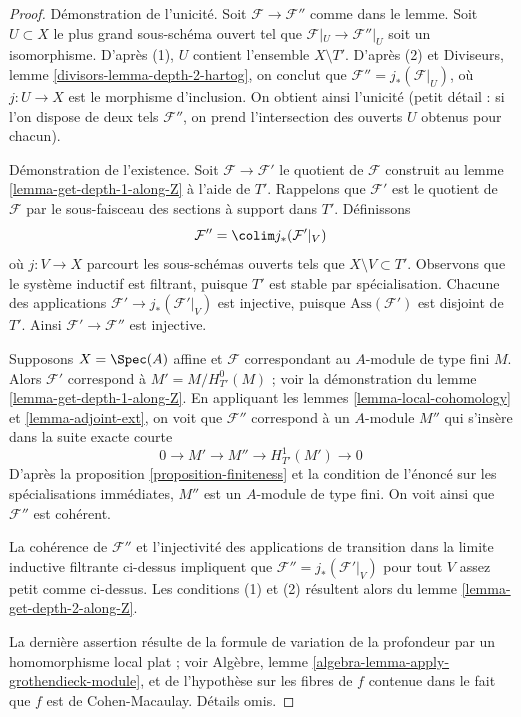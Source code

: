 \begin{proof}
Démonstration de l'unicité. Soit $\mathcal{F} \to \mathcal{F}''$ comme dans le lemme. Soit $U \subset X$ le plus grand sous-schéma ouvert tel que $\mathcal{F}|_U \to \mathcal{F}''|_U$ soit un isomorphisme. D'après (1), $U$ contient l'ensemble $X \setminus T'$. D'après (2) et Diviseurs, lemme \ref{divisors-lemma-depth-2-hartog}, on conclut que $\mathcal{F}'' = j_*(\mathcal{F}|_U)$, où $j : U \to X$ est le morphisme d'inclusion. On obtient ainsi l'unicité (petit détail : si l'on dispose de deux tels $\mathcal{F}''$, on prend l'intersection des ouverts $U$ obtenus pour chacun).

\medskip\noindent
Démonstration de l'existence. Soit $\mathcal{F} \to \mathcal{F}'$ le quotient de $\mathcal{F}$ construit au lemme \ref{lemma-get-depth-1-along-Z} à l'aide de $T'$. Rappelons que $\mathcal{F}'$ est le quotient de $\mathcal{F}$ par le sous-faisceau des sections à support dans $T'$. Définissons
$$
\mathcal{F}'' = \colim j_*(\mathcal{F}'|_V)
$$
où $j : V \to X$ parcourt les sous-schémas ouverts tels que $X \setminus V \subset T'$. Observons que le système inductif est filtrant, puisque $T'$ est stable par spécialisation. Chacune des applications $\mathcal{F}' \to j_*(\mathcal{F}'|_V)$ est injective, puisque $\text{Ass}(\mathcal{F}')$ est disjoint de $T'$. Ainsi $\mathcal{F}' \to \mathcal{F}''$ est injective.

\medskip\noindent
Supposons $X = \Spec(A)$ affine et $\mathcal{F}$ correspondant au $A$-module de type fini $M$. Alors $\mathcal{F}'$ correspond à $M' = M / H^0_{T'}(M)$ ; voir la démonstration du lemme \ref{lemma-get-depth-1-along-Z}. En appliquant les lemmes \ref{lemma-local-cohomology} et \ref{lemma-adjoint-ext}, on voit que $\mathcal{F}''$ correspond à un $A$-module $M''$ qui s'insère dans la suite exacte courte
$$
0 \to M' \to M'' \to H^1_{T'}(M') \to 0
$$
D'après la proposition \ref{proposition-finiteness} et la condition de l'énoncé sur les spécialisations immédiates, $M''$ est un $A$-module de type fini. On voit ainsi que $\mathcal{F}''$ est cohérent.

\medskip\noindent
La cohérence de $\mathcal{F}''$ et l'injectivité des applications de transition dans la limite inductive filtrante ci-dessus impliquent que $\mathcal{F}'' = j_*(\mathcal{F}'|_V)$ pour tout $V$ assez petit comme ci-dessus. Les conditions (1) et (2) résultent alors du lemme \ref{lemma-get-depth-2-along-Z}.

\medskip\noindent
La dernière assertion résulte de la formule de variation de la profondeur par un homomorphisme local plat ; voir Algèbre, lemme \ref{algebra-lemma-apply-grothendieck-module}, et de l'hypothèse sur les fibres de $f$ contenue dans le fait que $f$ est de Cohen-Macaulay. Détails omis.
\end{proof}

